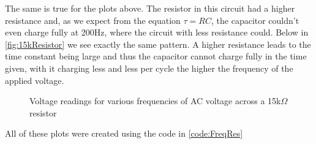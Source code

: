 \documentclass[12pt]{article}
\numberwithin{equation}{section}
\numberwithin{figure}{section}
\begin{document}
    The same is true for the plots above. The resistor in this circuit had a higher resistance and, as 
    we expect from the equation $\tau=RC$, the capacitor couldn't even charge fully at 200Hz, where the 
    circuit with less resistance could. \newline
    \newline
    Below in \autoref{fig:15kResistor} we see exactly the same pattern. A higher resistance leads to the 
    time constant being large and thus the capacitor cannot charge fully in the time given, with it charging 
    less and less per cycle the higher the frequency of the applied voltage.
    
    \begin{figure}[H]%
        \centering
        \qquad
        \qquad
        \qquad
        \caption{Voltage readings for various frequencies of AC voltage across a 15k$\Omega$ resistor}
        \label{fig:15kResistor}
    \end{figure}\noindent
    All of these plots were created using the code in \autoref{code:FreqRes}
\end{document}

